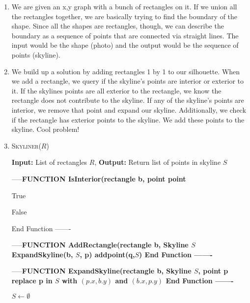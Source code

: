 \documentclass{article}
\begin{document}
\begin{enumerate}
	\item We are given an x,y graph with a bunch of rectangles on it. If we union all the rectangles together, we are basically trying to find the boundary of the shape. Since all the shapes are rectangles, though, we can describe the boundary as a sequence of points that are connected via straight lines. The input would be the shape (photo) and the output would be the sequence of points (skyline). 
	\item We build up a solution by adding rectangles 1 by 1 to our silhouette. When we add a rectangle, we query if the skyline's points are interior or exterior to it. If the skylines points are all exterior to the rectangle, we know the rectangle does not contribute to the skyline. If any of the skyline's points are interior, we remove that point and expand our skyline. Additionally, we check if the rectangle has exterior points to the skyline. We add these points to the skyline.  Cool problem!
	\item 
\begin{algorithm}\caption{\textsc{Skyliner}($R$)}\label{alg:bs}
                        {\bf Input:} List of rectangles $R$,
                        {\bf Output:} Return list of points in skyline $S$ 
                \begin{algorithmic}[h]
			\State -----\bf{FUNCTION IsInterior(rectangle b, point point}

		
			\State \Return True
			\EndIf
			
		
		\Else
			\State \Return False
		\EndIf

		\State End Function
			\State -------


	\State -----\bf{FUNCTION AddRectangle(rectangle b, Skyline $S$}
			\State ExpandSkyline(b, $S$, p)
			\EndIf
			\EndFor
			\State addpoint(q,$S$)
			\EndIf
			\EndFor
	\State End Function
	\State -------

	\State -----\bf{FUNCTION ExpandSkyline(rectangle b, Skyline $S$, point p}
			\State replace p in $S$ with $(p.x, b.y)$ and $(b.x, p.y)$
\State End Function
	\State -------




		\State $S \gets \emptyset$ 





\end{algorithmic}
\end{algorithm}
\end{enumerate}
\end{document}
